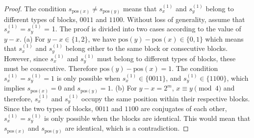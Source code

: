 \documentclass[10pt,a4paper]{amsart}
\newtheorem{cor}{Corollary}
\def\mod{\!\pmod}
\begin{document}
\begin{proof}
The condition $s_{\text{pos}(x)}\neq s_{\text{pos}(y)}$ means that $s_x^{(1)}$ and $s_y^{(1)}$ belong to different types of blocks, $0011$ and $1100$. Without loss of generality, assume that $s_x^{(1)} = s_y^{(1)}$ = 1. The proof is divided into two cases according to the value of $y-x$. (a) For $y-x \in \{1,2 \}$, we have $\text{pos}(y)-\text{pos}(x)\in \{0, 1\}$ which means that $s_x^{(1)}$ and $s_y^{(1)}$ belong either to the same block or consecutive blocks. However, since $s_x^{(1)}$ and $s_y^{(1)}$ must belong to different types of blocks, these must be consecutive.
Therefore $\text{pos}(y)-\text{pos}(x)=1$. The condition $s_x^{(1)} = s_y^{(1)} = 1$ is only possible when 
$s_x^{(1)} \in \{0011\}$, and $s_y^{(1)} \in \{1100\}$, which implies $s_{\text{pos}(x)}=0$ and $s_{\text{pos}(y)}=1$. (b) For $y-x=2^m$, $x \equiv y \mod{4}$ and therefore, $s_x^{(1)}$ and $s_y^{(1)}$ occupy the same position within their respective blocks. Since the two types of blocks, $0011$ and $1100$ are conjugates of each other, $s^{(1)}_{x} = s^{(1)}_{y}$ is only possible when the blocks are identical. This would mean that $s_{\text{pos}(x)}$ and $s_{\text{pos}(y)}$ are identical, which is a contradiction.
\end{proof}

 

\end{document}
